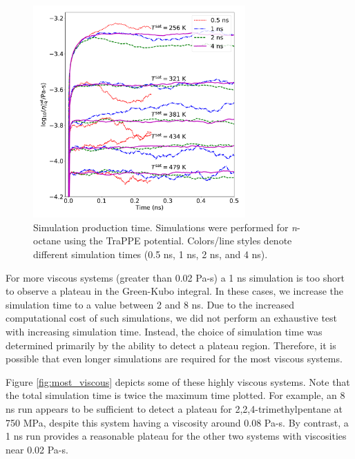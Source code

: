 \documentclass[preprint,review,12pt]{elsarticle}
\begin{document}
	\begin{figure}[htb!]
		\centering
		\includegraphics[width=3.2in]{simulation_time}
		\caption{Simulation production time. Simulations were performed for \textit{n}-octane using the TraPPE potential. Colors/line styles denote different simulation times (0.5 ns, 1 ns, 2 ns, and 4 ns).}
		\label{fig:simulation_time}
	\end{figure} 

    For more viscous systems (greater than 0.02 Pa-s) a 1 ns simulation is too short to observe a plateau in the Green-Kubo integral. In these cases, we increase the simulation time to a value between 2 and 8 ns. Due to the increased computational cost of such simulations, we did not perform an exhaustive test with increasing simulation time. Instead, the choice of simulation time was determined primarily by the ability to detect a plateau region. Therefore, it is possible that even longer simulations are required for the most viscous systems. 
    
    Figure \ref{fig:most_viscous} depicts some of these highly viscous systems. Note that the total simulation time is twice the maximum time plotted. For example, an 8 ns run appears to be sufficient to detect a plateau for 2,2,4-trimethylpentane at 750 MPa, despite this system having a viscosity around 0.08 Pa-s. By contrast, a 1 ns run provides a reasonable plateau for the other two systems with viscosities near 0.02 Pa-s.
    
\end{document}
